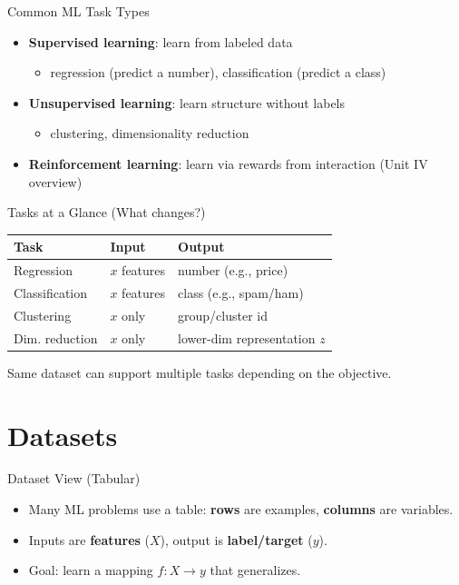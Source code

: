 \documentclass[aspectratio=169]{beamer}
\begin{document}
\begin{frame}{Common ML Task Types}
  \begin{itemize}[<+->]
    \item \textbf{Supervised learning}: learn from labeled data
      \begin{itemize}
        \item regression (predict a number), classification (predict a class)
      \end{itemize}
    \item \textbf{Unsupervised learning}: learn structure without labels
      \begin{itemize}
        \item clustering, dimensionality reduction
      \end{itemize}
    \item \textbf{Reinforcement learning}: learn via rewards from interaction (Unit IV overview)
  \end{itemize}
\end{frame}

\begin{frame}{Tasks at a Glance (What changes?)}
  \centering
  \begin{tabular}{lll}
    \toprule
    \textbf{Task} & \textbf{Input} & \textbf{Output} \\
    \midrule
    Regression & $x$ features & number (e.g., price) \\
    Classification & $x$ features & class (e.g., spam/ham) \\
    Clustering & $x$ only & group/cluster id \\
    Dim. reduction & $x$ only & lower-dim representation $z$ \\
    \bottomrule
  \end{tabular}
  \vspace{0.5em}
  \small Same dataset can support multiple tasks depending on the objective.
\end{frame}

\section{Datasets}
\label{sec:data}

\begin{frame}{Dataset View (Tabular)}
  \begin{itemize}[<+->]
    \item Many ML problems use a table: \textbf{rows} are examples, \textbf{columns} are variables.
    \item Inputs are \textbf{features} ($X$), output is \textbf{label/target} ($y$).
    \item Goal: learn a mapping $f: X \rightarrow y$ that generalizes.
  \end{itemize}
\end{frame}
\end{document}
